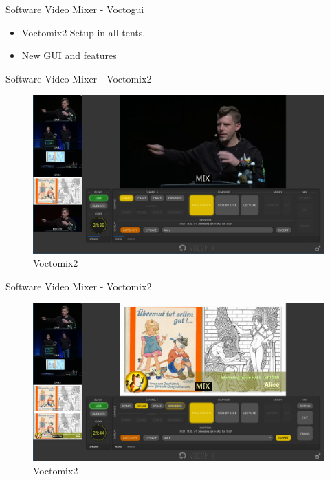 \documentclass[aspectratio=169]{beamer}
\begin{document}
\begin{frame}{Software Video Mixer - Voctogui}
	\begin{itemize}
		\item Voctomix2 Setup in all tents.
		\item New GUI and features
	\end{itemize}
\end{frame}

\begin{frame}{Software Video Mixer - Voctomix2}
	\begin{figure} 
		\centering
		\includegraphics[width=.9\textwidth]{images/voctomix2_1.png}
		\caption{Voctomix2}
	\end{figure}
\end{frame}

\begin{frame}{Software Video Mixer - Voctomix2}
	\begin{figure} 
		\centering
		\includegraphics[width=.9\textwidth]{images/voctomix2_2.png}
		\caption{Voctomix2}
	\end{figure}
\end{frame}
\end{document}
